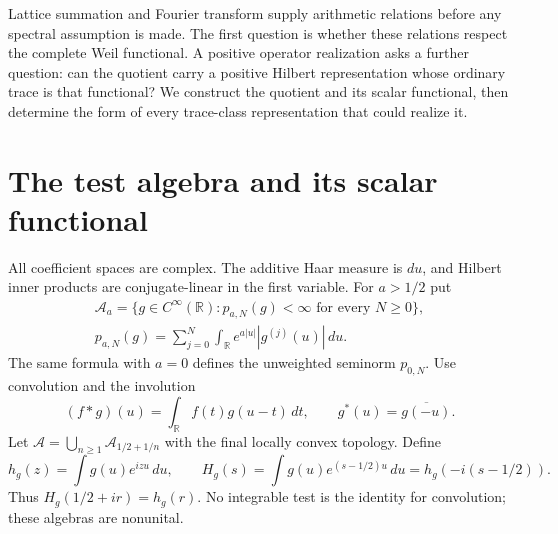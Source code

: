 Lattice summation and Fourier transform supply arithmetic relations before
any spectral assumption is made. The first question is whether these
relations respect the complete Weil functional. A positive operator
realization asks a further question: can the quotient carry a positive
Hilbert representation whose ordinary trace is that functional?
We construct the quotient and its scalar functional, then determine the
form of every trace-class representation that could realize it.

\section{The test algebra and its scalar functional}

All coefficient spaces are complex. The additive Haar measure is $du$,
and Hilbert inner products are conjugate-linear in the first variable.
For $a>1/2$ put
\begin{equation}\label{nwc:eq:tests}
\begin{gathered}
 \mathcal A_a=\{g\in C^\infty(\mathbb R):p_{a,N}(g)<\infty
       \text{ for every }N\geq0\},\\
 p_{a,N}(g)=\sum_{j=0}^N\int_{\mathbb R}e^{a|u|}|g^{(j)}(u)|\,du.
\end{gathered}
\end{equation}
The same formula with $a=0$ defines the unweighted seminorm $p_{0,N}$.
Use convolution and the involution
\[
 (f*g)(u)=\int_{\mathbb R}f(t)g(u-t)\,dt,
 \qquad g^*(u)=\overline{g(-u)}.
\]
Let $\mathcal A=\bigcup_{n\geq1}\mathcal A_{1/2+1/n}$ with the final
locally convex topology. Define
\begin{equation}\label{nwc:eq:transforms}
 h_g(z)=\int g(u)e^{izu}\,du,
 \qquad H_g(s)=\int g(u)e^{(s-1/2)u}\,du
             =h_g(-i(s-1/2)).
\end{equation}
Thus $H_g(1/2+ir)=h_g(r)$. No integrable test is the identity for
convolution; these algebras are nonunital.

